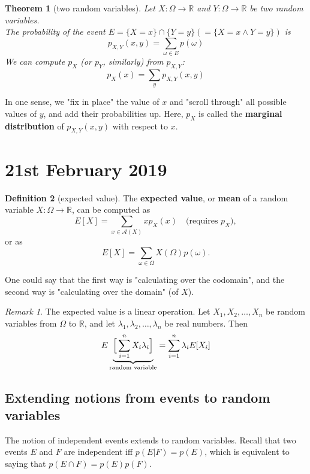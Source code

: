 \documentclass{report}
\theoremstyle{plain}
\newtheorem{thm}{Theorem}
\theoremstyle{definition}
\newtheorem{defn}[thm]{Definition}
\theoremstyle{remark}
\newtheorem*{remark}{Remark}
\begin{document}
\begin{thm}[two random variables]
	Let $X: \Omega \to \mathbb{R}$ and $Y: \Omega \to \mathbb{R}$ be two random variables. \\
	The probability of the event $E = \{X = x\} \cap \{Y = y\}(= \{X = x \land Y = y\})$ is
	\begin{equation}
		p_{X, Y}(x, y) = \sum_{\omega \in E} p(\omega)
	\end{equation}
	We can compute $p_X$ (or $p_Y$, similarly) from $p_{X, Y}$:
	\begin{equation}
		p_X(x) = \sum_y p_{X, Y}(x, y)
	\end{equation}
\end{thm}
In one sense, we "fix in place" the value of $x$ and "scroll through" all possible values of $y$, and add their probabilities up. Here, $p_X$ is called the \textbf{marginal distribution} of $p_{X, Y}(x, y)$ with respect to $x$.

\section{21st February 2019}

\begin{defn}[expected value]
The \textbf{expected value}, or \textbf{mean} of a random variable $X: \Omega \to \mathbb{R}$, can be computed as
\begin{equation}
	E[X] = \sum_{x \in \mathcal A(X)} x p_X(x) \quad \text{(requires $p_X$)},
\end{equation}
or as
\begin{equation}
	E[X] = \sum_{\omega \in \Omega} X(\Omega) p(\omega).
\end{equation}
\end{defn}
One could say that the first way is "calculating over the codomain", and the second way is "calculating over the domain" (of $X$). 

\begin{remark} The expected value is a linear operation. Let $X_1, X_2, \dots, X_n$ be random variables from $\Omega$ to $\mathbb{R}$, and let $\lambda_1, \lambda_2, \dots, \lambda_n$ be real numbers. Then
\begin{equation}
	E\underbrace{\Bigr[\sum_{i=1}^n X_i\lambda_i\Bigl]}_{\text{random variable}} = \sum_{i=1}^n \lambda_i E[X_i]
\end{equation}
\end{remark}

\subsection{Extending notions from events to random variables}
The notion of independent events extends to random variables. Recall that two events $E$ and $F$ are independent iff $p(E|F) = p(E)$, which is equivalent to saying that $p(E \cap F) = p(E)p(F)$. 
\end{document}
